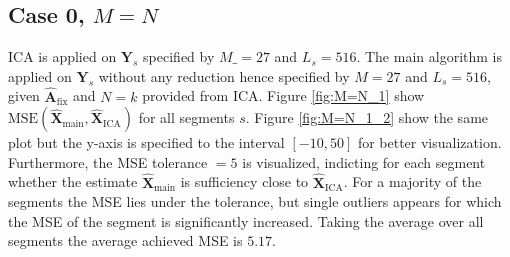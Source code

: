 \subsection{Case 0, $M = N$}
ICA is applied on $\mathbf{Y}_s$ specified by $M\_ = 27$ and $L_s = 516$. 
The main algorithm is applied on $\mathbf{Y}_s$ without any reduction hence specified by $M = 27$ and $L_s = 516$, given $\hat{\mathbf{A}}_{\text{fix}}$ and $N = k$ provided from ICA.
Figure \ref{fig:M=N_1} show $\text{MSE}\left(\hat{\mathbf{X}}_{\text{main}},\hat{\mathbf{X}}_{\text{ICA}}\right)$ for all segments $s$. 
Figure \ref{fig:M=N_1_2} show the same plot but the y-axis is specified to the interval $[-10,50]$ for better visualization.
Furthermore, the MSE tolerance $= 5$ is visualized, indicting for each segment whether the estimate $\hat{\mathbf{X}}_{\text{main}}$ is sufficiency close to $\hat{\mathbf{X}}_{\text{ICA}}$. 
For a majority of the segments the MSE lies under the tolerance, but single outliers appears for which the MSE of the segment is significantly increased. Taking the average over all segments the average achieved MSE is $5.17$.    
